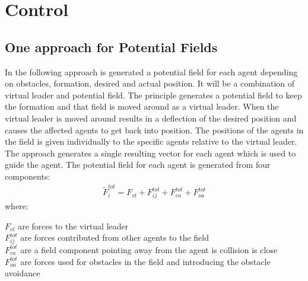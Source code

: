 \chapter{Control}
\label{ch:control}




\section{One approach for Potential Fields}
In the following approach is generated a potential field for each agent depending on obstacles, formation, desired and actual position. It will be a combination of virtual leader and potential field. The principle generates a potential field to keep the formation and that field is moved around as a virtual leader. When the virtual leader is moved around results in a deflection of the desired position and causes the affected agents to get back into position. The positions of the agents in the field is given individually to the specific agents relative to the virtual leader. The approach generates a single resulting vector for each agent which is used to guide the agent. The potential field for each agent is generated from four components:
\begin{align}
\tilde{F}_i^{tot} = F_{vl}+F_{ij}^{tot}+F_{ca}^{tot}+F_{oa}^{tot}
\end{align}
where:
\begin{ffk}
$F_{vl}$ are forces to the virtual leader\\
$F_{ij}^{tot}$ are forces contributed from other agents to the field\\
$F_{ca}^{tot}$ are a field component pointing away from the agent is collision is close\\
$F_{oa}^{tot}$ are forces used for obstacles in the field and introducing the obstacle avoidance
\end{ffk}
